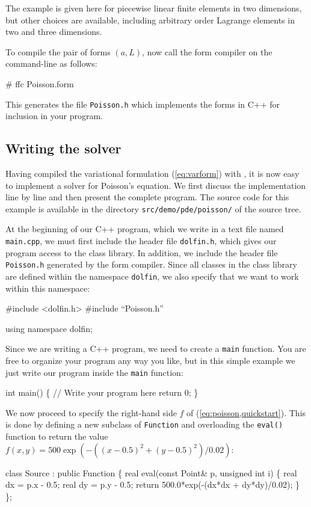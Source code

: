 The example is given here for piecewise linear finite elements in two
dimensions, but other choices are available, including arbitrary order
Lagrange elements in two and three dimensions.

To compile the pair of forms $(a, L)$, now call the form compiler on
the command-line as follows:
\begin{code}
  # ffc Poisson.form
\end{code}
This generates the file \texttt{Poisson.h} which implements the forms
in C++ for inclusion in your \dolfin{} program.

\subsection{Writing the solver}

Having compiled the variational formulation (\ref{eq:varform})
with \ffc{}, it is now easy to implement a solver for Poisson's
equation. We first discuss the implementation line by line and then
present the complete program. The source code for this example is
available in the directory \texttt{src/demo/pde/poisson/} of the \dolfin{}
source tree.

At the beginning of our C++ program, which we write in a text file
named \texttt{main.cpp}, we must first include the header file
\texttt{dolfin.h}, which gives our program access to the \dolfin{}
class library. In addition, we include the header file
\texttt{Poisson.h} generated by the form compiler. Since all classes
in the \dolfin{} class library are defined within the namespace
\texttt{dolfin}, we also specify that we want to work within this
namespace:
\begin{code}
  #include <dolfin.h>
  #include ``Poisson.h''
  
  using namespace dolfin;
\end{code}

Since we are writing a C++ program, we need to create a \texttt{main}
function.  You are free to organize your program any way you like, but
in this simple example we just write our program inside the
\texttt{main} function:

\begin{code}
  int main()
  \{
    // Write your program here
    return 0;
  \}
\end{code}

We now proceed to specify the right-hand side $f$ of (\ref{eq:poisson,quickstart}).
This is done by defining a new subclass of \texttt{Function}
and overloading the \texttt{eval()}
function to return the value $f(x, y) = 500 \exp(-((x-0.5)^2 +
(y-0.5)^2)/0.02)$:
\begin{code}
  class Source : public Function
  \{
    real eval(const Point& p, unsigned int i)
    \{
      real dx = p.x - 0.5;
      real dy = p.y - 0.5;
      return 500.0*exp(-(dx*dx + dy*dy)/0.02);
    \}
  \};
\end{code}

